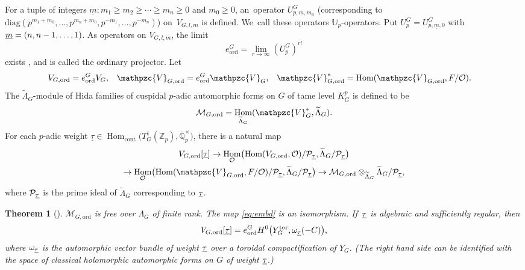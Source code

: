 \documentclass[JEP,XML,SOM,Unicode,published]{cedram}
\theoremstyle{plain}
\newtheorem{thm}{Theorem}[subsection]
\theoremstyle{remark}
\newcommand{\bQ}{\mathbb{Q}}
\newcommand{\bU}{\mathbb{U}}
\newcommand{\bZ}{\mathbb{Z}}
\newcommand{\cM}{\mathcal{M}}
\newcommand{\cO}{\mathcal{O}}
\newcommand{\cP}{\mathcal{P}}
\newcommand{\pzV}{\mathpzc{V}}
\newcommand{\utau}{\protect\underline{\tau}}
\newcommand{\cont}{\mathrm{cont}}
\newcommand{\diag}{\mathrm{diag}}
\newcommand{\ord}{\mathrm{ord}}
\newcommand{\tor}{\mathrm{tor}}
\DeclareMathOperator{\Hom}{Hom}
\let\wt\widetilde
\begin{document}
For a tuple of integers $\underline{m}:m_1\!\geq\! m_2\!\geq\!\cdots\!\geq\! m_n\!\geq\! 0$ and $m_0\!\geq\! 0$, an~oper\-ator $U^G_{p,\underline{m},m_0}$ (corresponding to $\diag(p^{m_1+m_0},\dots,p^{m_n+m_0},p^{-m_1},\dots,p^{-m_n})$) on~$V_{G,l,m}$ is defined. We~call these operators $\bU_p$-operators. Put $U^G_p=U^G_{p,\underline{m},0}$ with $\underline{m}=(n,n-\nobreak1,\dots,1)$. As operators on $V_{G,l,m}$, the limit
\[
e^G_\ord=\lim_{r\to \infty} \left(U^G_p\right)^{r!}
\]
exists \cite[Th.\,1.1 (3)]{HidaCon}\cite[\S6.1.3]{SLF}, and is called the ordinary projector. Let
\begin{align*}
V_{G,\ord}&= e^G_\ord V_G,
&\pzV_{G,\ord}&= e^G_\ord \pzV_G,
&\pzV^*_{G,\ord}&=\Hom(\pzV_{G,\ord},F/\cO).
\end{align*}
The $\tilde{\Lambda}_G$-module of Hida families of cuspidal $p$-adic automorphic forms on $G$ of tame level $K^p_G$ is defined to be
\[
\cM_{G,\ord}=\Hom_{\wt{\Lambda}_G}(\pzV^*_G,\wt{\Lambda}_G).
\]
For each $p$-adic weight $\underline{\tau}\in \Hom_{\cont}\bigl(T^1_G(\bZ_p),\bar{\bQ}^\times_p\bigr)$, there is a natural map
\begin{multline}\label{eq:embd}
V_{G,\ord}[\utau]
\to \Hom_{\cO}\bigl(\Hom(V_{G,\ord},\cO)/\cP_{\utau},\wt{\Lambda}_G/\cP_{\utau}\bigr)\\
\to \Hom_{\cO}\bigl(\Hom(\pzV_{G,\ord},F/\cO)/\cP_{\utau},\wt{\Lambda}_G/\cP_{\utau}\bigr) \to \cM_{G,\ord}\otimes_{\wt{\Lambda}_G} \wt{\Lambda}_G/\cP_{\utau},
\end{multline}
where $\cP_{\utau}$ is the prime ideal of $\wt{\Lambda}_G$ corresponding to $\utau$.

\begin{thm}[{\cite[Th.\,1.1]{HidaCon}}]
$\cM_{G,\ord}$ is free over $\Lambda_{G}$ of finite rank. The map \eqref{eq:embd} is an isomorphism. If~$\utau$ is algebraic and sufficiently regular, then
\[
V_{G,\ord}[\utau]=e^G_\ord H^0\bigl(Y^\tor_G,\omega_{\utau}(-C)\bigr),
\]
where $\omega_{\utau}$ is the automorphic vector bundle of weight $\utau$ over a toroidal compactification of $Y_G$. (The right hand side can be identified with the space of classical holomorphic automorphic forms on $G$ of weight $\utau$.)
\end{thm}
\end{document}
